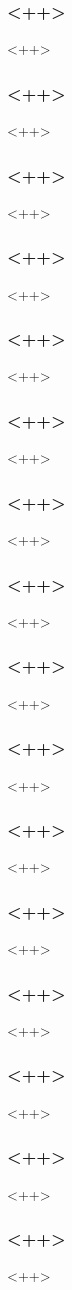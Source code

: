 \begin{frame}[fragile] %
\frametitle{<++>}
<++>
\end{frame}

\begin{frame}[fragile] %
\frametitle{<++>}
<++>
\end{frame}

\begin{frame}[fragile] %
\frametitle{<++>}
<++>
\end{frame}

\begin{frame}[fragile] %
\frametitle{<++>}
<++>
\end{frame}

\begin{frame}[fragile] %
\frametitle{<++>}
<++>
\end{frame}

\begin{frame}[fragile] %
\frametitle{<++>}
<++>
\end{frame}

\begin{frame}[fragile] %
\frametitle{<++>}
<++>
\end{frame}

\begin{frame}[fragile] %
\frametitle{<++>}
<++>
\end{frame}

\begin{frame}[fragile] %
\frametitle{<++>}
<++>
\end{frame}

\begin{frame}[fragile] %
\frametitle{<++>}
<++>
\end{frame}

\begin{frame}[fragile] %
\frametitle{<++>}
<++>
\end{frame}

\begin{frame}[fragile] %
\frametitle{<++>}
<++>
\end{frame}

\begin{frame}[fragile] %
\frametitle{<++>}
<++>
\end{frame}

\begin{frame}[fragile] %
\frametitle{<++>}
<++>
\end{frame}

\begin{frame}[fragile] %
\frametitle{<++>}
<++>
\end{frame}

\begin{frame}[fragile] %
\frametitle{<++>}
<++>
\end{frame}


